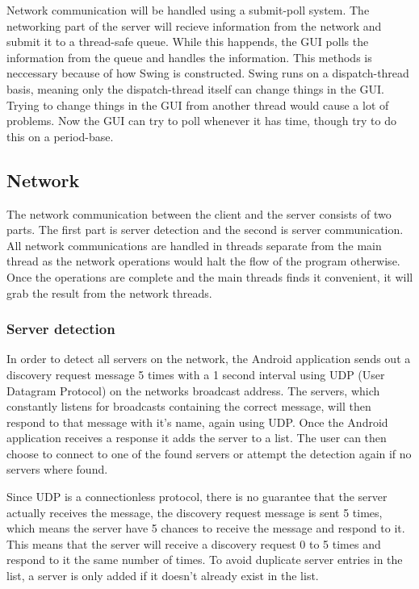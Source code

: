 \documentclass[12pt,a4paper,notitlepage]{report}
\begin{document}
Network communication will be handled using a submit-poll system. The networking part of the server will recieve information from the network and submit it to a thread-safe queue. While this happends, the GUI polls the information from the queue and handles the information. This methods is neccessary because of how Swing is constructed. Swing runs on a dispatch-thread basis, meaning only the dispatch-thread itself can change things in the GUI. Trying to change things in the GUI from another thread would cause a lot of problems. Now the GUI can try to poll whenever it has time, though try to do this on a period-base.  

\subsection{Network}
The network communication between the client and the server consists of two parts. The first part is server detection and the second is server communication. All network communications are handled in threads separate from the main thread as the network operations would halt the flow of the program otherwise. Once the operations are complete and the main threads finds it convenient, it will grab the result from the network threads.

\subsubsection{Server detection}
In order to detect all servers on the network, the Android application sends out a discovery request message 5 times with a 1 second interval using UDP (User Datagram Protocol) on the networks broadcast address. The servers, which constantly listens for broadcasts containing the correct message, will then respond to that message with it's name, again using UDP. Once the Android application receives a response it adds the server to a list. The user can then choose to connect to one of the found servers or attempt the detection again if no servers where found.

Since UDP is a connectionless protocol, there is no guarantee that the server actually receives the message, the discovery request message is sent 5 times, which means the server have 5 chances to receive the message and respond to it. This means that the server will receive a discovery request 0 to 5 times and respond to it the same number of times. To avoid duplicate server entries in the list, a server is only added if it doesn't already exist in the list.
\end{document}
